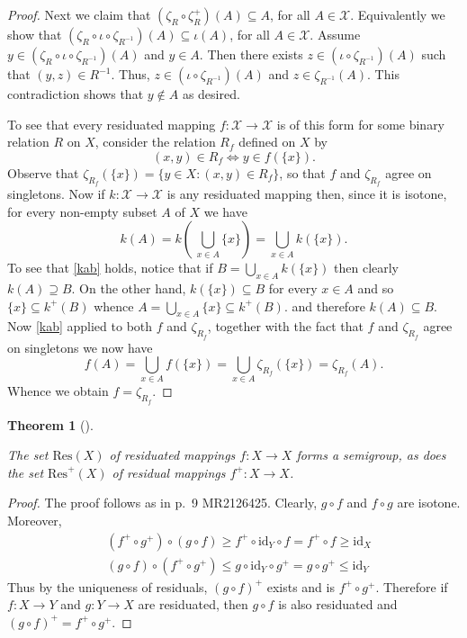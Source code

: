 \documentclass[
  letterpaper,
  10pt,
  reqno,
  twopage,
  openany]{book}
\theoremstyle{plain}
\theoremstyle{definition}
\theoremstyle{definition}
\theoremstyle{definition}
\theoremstyle{plain}
\theoremstyle{plain}
\newtheorem{theorem}{Theorem}[chapter]
\theoremstyle{remark}
\begin{document}
\begin{proof}
Next we claim that \((\zeta_R\circ \zeta_R^+)(A)\subseteq A\), for all
\(A\in \mathcal{X}\). Equivalently we show that
\((\zeta_R\circ \iota\circ \zeta_{R^{-1}})(A) \subseteq \iota(A)\), for
all \(A\in \mathcal{X}\). Assume
\(y\in (\zeta_R\circ \iota\circ \zeta_{R^{-1}})(A)\) and \(y\in A\).
Then there exists \(z\in (\iota\circ \zeta_{R^{-1}})(A)\) such that
\((y,z)\in R^{-1}\). Thus, \(z\in (\iota\circ \zeta_{R^{-1}})(A)\) and
\(z\in \zeta_{R^{-1}}(A)\). This contradiction shows that \(y\notin A\)
as desired.

To see that every residuated mapping \(f : \mathcal{X} \to \mathcal{X}\)
is of this form for some binary relation \(R\) on \(X\), consider the
relation \(R_f\) defined on \(X\) by \[
(x,y)\in R_f \Longleftrightarrow y\in f(\{x\}).
\] Observe that \(\zeta_{R_f}(\{x\})=\{y\in X : (x,y)\in R_f\}\), so
that \(f\) and \(\zeta_{R_f}\) agree on singletons. Now if
\(k: \mathcal{X}\to \mathcal{X}\) is any residuated mapping then, since
it is isotone, for every non-empty subset \(A\) of \(X\) we have
\begin{equation}
\label{kab}
k(A)=k\left(\, \bigcup_{x\in A}\{x\}\right)=\bigcup_{x\in A} k(\{x\}).
\end{equation} To see that \ref{kab} holds, notice that if
\(B=\bigcup_{x\in A} k(\{x\})\) then clearly \(k(A)\supseteq B\). On the
other hand, \(k(\{x\})\subseteq B\) for every \(x\in A\) and so
\(\{x\}\subseteq k^+(B)\) whence
\(A=\bigcup_{x\in A}\{x\}\subseteq k^+(B)\). and therefore
\(k(A)\subseteq B\). Now \ref{kab} applied to both \(f\) and
\(\zeta_{R_f}\), together with the fact that \(f\) and \(\zeta_{R_f}\)
agree on singletons we now have \[
f(A)
=\bigcup_{x\in A} f(\{x\})
=\bigcup_{x\in A} \zeta_{R_f} (\{x\})
=\zeta_{R_f} (A).
\] Whence we obtain \(f=\zeta_{R_f}\).

\end{proof}

\leavevmode{}%
\begin{theorem}[]\label{thm-residuated-mappings-semigroup}

The set \(\text{Res}(X)\) of residuated mappings \(f : X \to X\) forms a
semigroup, as does the set \(\text{Res}^+(X)\) of residual mappings
\(f^+:X\to X\).

\end{theorem}

\begin{proof}

The proof follows as in p.~9 MR2126425. Clearly, \(g\circ f\) and
\(f\circ g\) are isotone. Moreover, \begin{align*}
& (f^+\circ g^+)\circ (g\circ f)\geq f^+\circ \text{id}_Y \circ f=f^+\circ f \geq \text{id}_X \\
& (g\circ f)\circ (f^+\circ g^+)\leq g\circ \text{id}_Y \circ g^+=g\circ g^+ \leq \text{id}_Y
\end{align*} Thus by the uniqueness of residuals, \((g\circ f)^+\)
exists and is \(f^+\circ g^+\). Therefore if \(f:X\to Y\) and
\(g:Y\to X\) are residuated, then \(g\circ f\) is also residuated and
\((g\circ f)^+=f^+\circ g^+\).

\end{proof}
\end{document}

